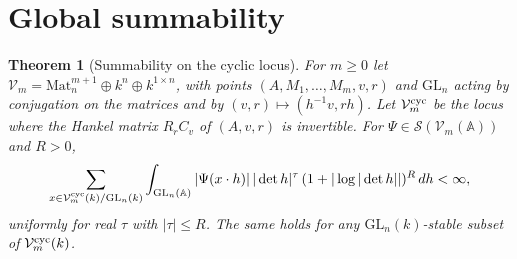 \documentclass[11pt,oneside,notitlepage]{book}
\numberwithin{equation}{section}
\theoremstyle{plain}
\newtheorem{theorem}{Theorem}[section]
\theoremstyle{definition}
\newcommand{\A}{\mathbb{A}}
\newcommand{\GL}{\mathrm{GL}}
\newcommand{\Mat}{\mathrm{Mat}}
\newcommand{\cS}{\mathcal{S}}
\begin{document}
\section{Global summability}

\begin{theorem}[Summability on the cyclic locus]\label{thm:A-sum}
For $m\ge0$ let $\mathcal V_m=\Mat_n^{m+1}\oplus k^n\oplus k^{1\times n}$, with points $(A,M_1,\dots,M_m,v,r)$ and $\GL_n$ acting by conjugation on the matrices and by $(v,r)\mapsto(h^{-1}v,rh)$. Let $\mathcal V_m^{\rm cyc}$ be the locus where the Hankel matrix $R_rC_v$ of $(A,v,r)$ is invertible. For $\Psi\in\cS(\mathcal V_m(\A))$ and $R>0$,
\[\sum_{x\in\mathcal V_m^{\rm cyc}(k)/\GL_n(k)}\int_{\GL_n(\A)}|\Psi(x\cdot h)|\,|\det h|^{\tau}\,(1+|\log|\det h||)^R\,dh<\infty,\]
uniformly for real $\tau$ with $|\tau|\le R$. The same holds for any $\GL_n(k)$-stable subset of $\mathcal V^{\rm cyc}_m(k)$.
\end{theorem}
\end{document}
